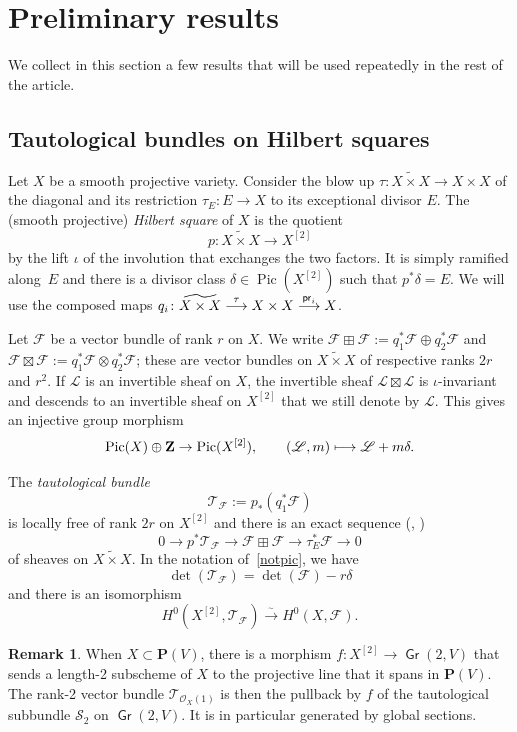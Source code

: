 \documentclass[JEP,XML,SOM,Unicode, NoEqCountersInSection,NoFloatCountersInSection]{cedram}
\let\mathcal\mathscr
\newcommand\mto{\mathchoice{\longmapsto}{\mapsto}{\mapsto}{\mapsto}}
\newcommand\To[1]{\mathchoice{\xrightarrow{\textstyle\kern4pt#1\kern3pt}}{\stackrel{#1}{\longrightarrow}}{}{}}
\newcommand{\isomlra}{\stackrel{{}_{\scriptstyle\sim}}{\to}}
\theoremstyle{definition}
\newtheorem{rema}[lemm]{Remark}
\newcommand\Z{{\mathbf Z}}
\renewcommand\P{{\mathbf P}}\let\PP\P
\newcommand\cF{\mathcal{F}}
\newcommand\cL{\mathcal{L}}
\newcommand\cO{\mathcal{O}}\let\OO\cO
\newcommand\cS{\mathcal{S}}\let\soustauto\cS
\newcommand\cT{\mathcal{T}}
\DeclareMathOperator{\Gr}{\mathsf{Gr}}
\DeclareMathOperator{\Pic}{Pic}
\newcommand{\pr}{\mathsf{pr}}
\begin{document}
\section{Preliminary results}
We collect in this section a few results that will be used repeatedly in the rest of the article.

\subsection{Tautological bundles on Hilbert squares}\label{sectaut}

Let $X$ be a smooth projective variety. Consider the blow up $\tau\colon \widetilde{X\times X}\to {X\times X}$ of the diagonal and its restriction $\tau_E\colon E\to X$ to its exceptional divisor $E$.
The (smooth projective) \emph{Hilbert square} of $X$ is the quotient
\[
p\colon \widetilde{X\times X} \to X^{[2]} 
\]
by the lift $\iota$ of the involution that exchanges the two factors. It is simply ramified along~$E$ and there is a divisor class $\delta\in \Pic( X^{[2]} )$ such that $p^*\delta =E$.
We will use the composed maps $q_i\colon\widetilde{X\times X}\To{\tau} X\times X\To{\pr_i} X$.

Let $\cF$ be a vector bundle of rank $r$ on $X$. We write $\cF\boxplus\cF:=q_1^*\cF\oplus q_2^*\cF$ and $\cF\boxtimes\cF:=q_1^*\cF\otimes q_2^*\cF$; these are vector bundles on $\widetilde{X\times X} $ of respective ranks $2r$ and $r^2$.
If $\cL$ is an invertible sheaf on $X$, the invertible sheaf $\cL\boxtimes\cL$ is $\iota$-invariant and descends to an invertible sheaf on $X^{[2]} $ that we still denote by $\cL$. This gives an injective group morphism
\begin{equation}\label{notpic}
\Pic(X)\oplus \Z \to \Pic(X^{[2]}),\qquad (\cL,m)\mto \cL+m\delta.
\end{equation}

The \emph{tautological bundle}
\[
\cT_\cF:=p_*(q_1^*\cF)
\]
is locally free of rank $2r$ on $X^{[2]}$ and there is an exact sequence (\cite[Prop.\,2.3]{dan}, \cite[(3)]{wan})
\[\label{deftaut}
0\to p^*\cT_\cF \to \cF\boxplus\cF \to \tau_E^*\cF\to 0
\]
of sheaves on $\widetilde{X\times X} $. In the notation of~\eqref{notpic}, we have
\begin{equation}\label{dete}
\det(\cT_\cF)= \det(\cF)-r {\delta}
\end{equation}
and there is an isomorphism
\[
H^0(X^{[2]}, \cT_\cF) \isomlra H^0(X,\cF).
\]

\begin{rema}\label{rem41}
When $X\subset \P(V)$, there is a morphism $f\colon X^{[2]}\to \Gr(2,V)$ that sends a length-2 subscheme of $X$ to the projective line that it spans in $\P(V) $. The rank-2 vector bundle $ \cT_{\cO_X(1)}$ is then the pullback by $f$ of the tautological subbundle $\cS_2$ on $\Gr(2,V) $. It is in particular generated by global sections.
\end{rema}
\end{document}
